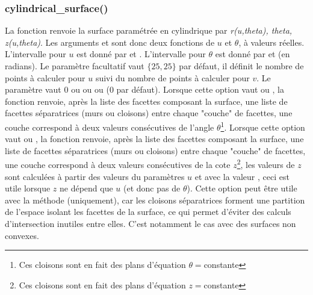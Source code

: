 \subsubsection{cylindrical\_surface()}

La fonction  renvoie la surface paramétrée en cylindrique par \emph{r(u,theta), theta, z(u,theta)}. Les arguments  et  sont donc deux fonctions de $u$ et $\theta$, à valeurs réelles. L'intervalle pour $u$ est donné par  et . L'intervalle pour $\theta$ est donné par  et  (en radians). Le paramètre facultatif  vaut $\{25,25\}$ par défaut, il définit le nombre de points à calculer pour $u$ suivi du nombre de points à calculer pour $v$. Le paramètre  vaut $0$ ou   ou  ou  ($0$ par défaut). Lorsque cette option vaut   ou  , la fonction renvoie, après la liste des facettes composant la surface, une liste de facettes séparatrices (murs ou cloisons) entre chaque "couche" de facettes, une couche correspond à deux valeurs consécutives de l'angle $\theta$\footnote{Ces cloisons sont en fait des plans d'équation $\theta=$constante}. Lorsque cette option vaut   ou , la fonction renvoie, après la liste des facettes composant la surface, une liste de facettes séparatrices (murs ou cloisons) entre chaque "couche" de facettes, une couche correspond à deux valeurs consécutives de la cote $z$\footnote{Ces cloisons sont en fait des plans d'équation $z=$constante}, les valeurs de $z$ sont calculées à  partir des valeurs du paramètres $u$ et avec la valeur , ceci est utile lorsque $z$ ne dépend que $u$ (et donc pas de $\theta$). Cette option peut être utile avec la méthode  (uniquement), car les cloisons séparatrices forment une partition de l'espace isolant les facettes de la surface, ce qui permet d'éviter des calculs d'intersection inutiles entre elles. C'est notamment le cas avec des surfaces non convexes.

